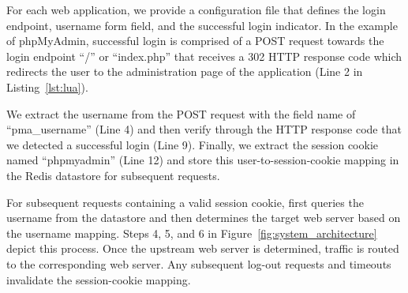 For each web application, we provide a configuration file that defines the login endpoint, username form field, and the successful login indicator. 
In the example of phpMyAdmin, successful login is comprised of a POST request towards the login endpoint ``/'' or ``index.php'' that receives a 302 HTTP response code which redirects the user to the administration page of the application (Line 2 in Listing~\ref{lst:lua}). 

We extract the username from the POST request with the field name of ``pma\_username'' (Line 4) 
and then verify through the HTTP response code that we detected a successful login (Line 9). Finally, we extract the session cookie named ``phpmyadmin'' (Line 12) and store this user-to-session-cookie mapping in the Redis datastore for subsequent requests. 

For subsequent requests containing a valid session cookie, \sys{} first queries the username from the datastore and then determines the target web server based on the username mapping. 
Steps 4, 5, and 6 in Figure~\ref{fig:system_architecture} depict this process. 
Once the upstream web server is determined, traffic is routed to the corresponding web server. 
Any subsequent log-out requests and timeouts invalidate the session-cookie mapping.